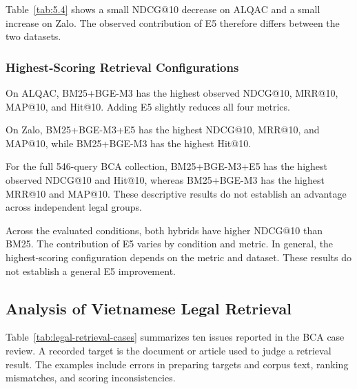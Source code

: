 Table~\ref{tab:5.4} shows a small NDCG@10 decrease on ALQAC and a small increase on Zalo. The observed contribution of E5 therefore differs between the two datasets.

\subsubsection{Highest-Scoring Retrieval Configurations}

On ALQAC, BM25+BGE-M3 has the highest observed NDCG@10, MRR@10, MAP@10, and Hit@10. Adding E5 slightly reduces all four metrics.

On Zalo, BM25+BGE-M3+E5 has the highest NDCG@10, MRR@10, and MAP@10, while BM25+BGE-M3 has the highest Hit@10.

For the full 546-query BCA collection, BM25+BGE-M3+E5 has the highest observed NDCG@10 and Hit@10, whereas BM25+BGE-M3 has the highest MRR@10 and MAP@10. These descriptive results do not establish an advantage across independent legal groups.

Across the evaluated conditions, both hybrids have higher NDCG@10 than BM25. The contribution of E5 varies by condition and metric. In general, the highest-scoring configuration depends on the metric and dataset. These results do not establish a general E5 improvement.

\subsection{Analysis of Vietnamese Legal Retrieval}
\label{sec:vietnamese-legal-retrieval-analysis}

Table~\ref{tab:legal-retrieval-cases} summarizes ten issues reported in the BCA case review. A recorded target is the document or article used to judge a retrieval result. The examples include errors in preparing targets and corpus text, ranking mismatches, and scoring inconsistencies. 

